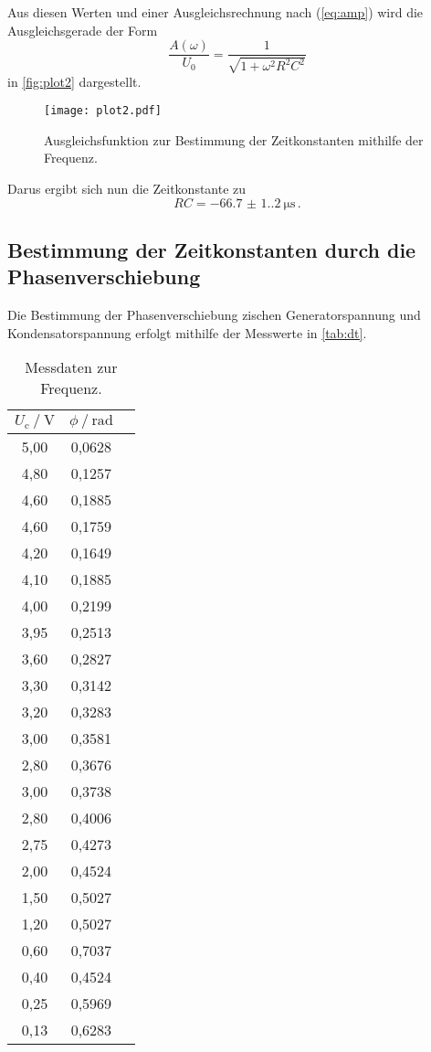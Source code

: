 Aus diesen Werten und einer Ausgleichsrechnung nach (\ref{eq:amp}) wird die Ausgleichsgerade der Form
\begin{equation*}
  \frac{A(\omega)}{U_{0}}=\frac{1}{\sqrt{1+\omega^{2} R^{2} C^{2}}}
\end{equation*}
in \autoref{fig:plot2} dargestellt.
\begin{figure}[H]
  \centering
  \texttt{[image: plot2.pdf]}
  \caption{Ausgleichsfunktion zur Bestimmung der Zeitkonstanten mithilfe der Frequenz.}
  \label{fig:plot2}
\end{figure}
Darus ergibt sich nun die Zeitkonstante zu
\begin{equation*}
  RC = \qty{-66.7(1.2)}{\micro\second} \, .
\end{equation*}


\subsection{Bestimmung der Zeitkonstanten durch die Phasenverschiebung}

Die Bestimmung der Phasenverschiebung zischen Generatorspannung und Kondensatorspannung erfolgt mithilfe der Messwerte in \autoref{tab:dt}.
\begin{table} [h]
  \centering
  \caption{Messdaten zur Frequenz.}
  \label{tab:dt}
  \begin{tabular}{c c c}
    \toprule
    $U_\text{c} \mathbin{/} \unit{\volt}$ &  $\phi \mathbin{/} \mathrm{rad}$ \\
    \midrule
     5,00 &   0,0628 \\
     4,80 &   0,1257 \\
     4,60 &   0,1885 \\
     4,60 &   0,1759 \\
     4,20 &   0,1649 \\
     4,10 &   0,1885 \\
     4,00 &   0,2199 \\
     3,95 &   0,2513 \\
     3,60 &   0,2827 \\
     3,30 &   0,3142 \\
     3,20 &   0,3283 \\
     3,00 &   0,3581 \\
     2,80 &   0,3676 \\
     3,00 &   0,3738 \\
     2,80 &   0,4006 \\
     2,75 &   0,4273 \\
     2,00 &   0,4524 \\
     1,50 &   0,5027 \\
     1,20 &   0,5027 \\
     0,60 &   0,7037 \\
     0,40 &   0,4524 \\
     0,25 &   0,5969 \\
     0,13 &   0,6283 \\
    \bottomrule
  \end{tabular}
\end{table}


